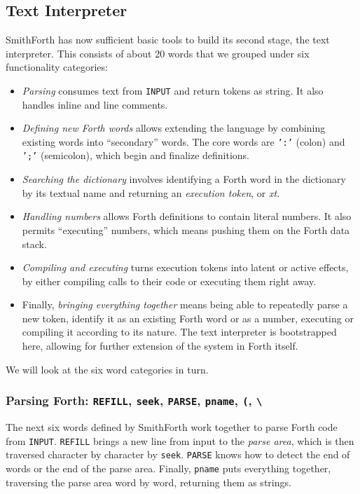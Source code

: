 \documentclass[a4paper,12pt,final]{article}
\begin{document}
\subsection{Text Interpreter}
\label{sec:org779e83c}

SmithForth has now sufficient basic tools to build its second stage,
the text interpreter.  This consists of about 20 words that we grouped
under six functionality categories:
\begin{itemize}
\item \emph{Parsing} consumes text from \texttt{INPUT} and return tokens as string. It
also handles inline and line comments.
\item \emph{Defining new Forth words} allows extending the language by
combining existing words into ``secondary'' words.  The core words
are \texttt{':'} (colon) and \texttt{';'} (semicolon), which begin and finalize
definitions.
\item \emph{Searching the dictionary} involves identifying a Forth word in the
dictionary by its textual name and returning an \emph{execution token},
or \emph{xt}.
\item \emph{Handling numbers} allows Forth definitions to contain literal
numbers.  It also permits ``executing'' numbers, which means pushing
them on the Forth data stack.
\item \emph{Compiling and executing} turns execution tokens into latent or
active effects, by either compiling calls to their code or executing
them right away.
\item Finally, \emph{bringing everything together} means being able to
repeatedly parse a new token, identify it as an existing Forth word
or as a number, executing or compiling it according to its nature.
The text interpreter is bootstrapped here, allowing for further
extension of the system in Forth itself.
\end{itemize}

We will look at the six word categories in turn.
\clearpage

\subsubsection{Parsing Forth: \texttt{REFILL}, \texttt{seek}, \texttt{PARSE}, \texttt{pname}, \texttt{(}, \texttt{\textbackslash{}}}
\label{sec:org973a49c}

The next six words defined by SmithForth work together to parse Forth
code from \texttt{INPUT}.  \texttt{REFILL} brings a new line from input to the
\emph{parse area}, which is then traversed character by character by
\texttt{seek}. \texttt{PARSE} knows how to detect the end of words or the end of the
parse area.  Finally, \texttt{pname} puts everything together, traversing the
parse area word by word, returning them as strings.
\end{document}
